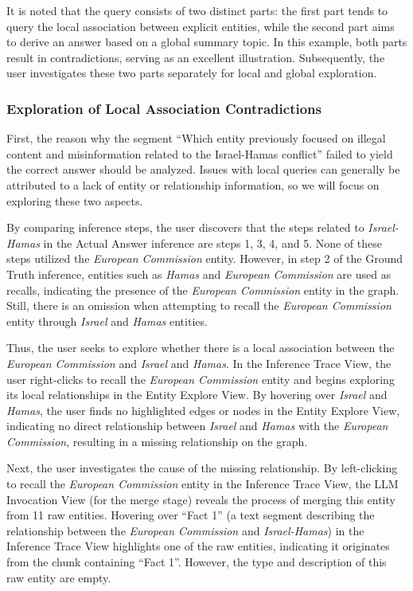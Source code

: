 It is noted that the query consists of two distinct parts: the first part tends to query the local association between explicit entities, while the second part aims to derive an answer based on a global summary topic. In this example, both parts result in contradictions, serving as an excellent illustration. Subsequently, the user investigates these two parts separately for local and global exploration.

\subsubsection{Exploration of Local Association Contradictions}

First, the reason why the segment ``Which entity previously focused on illegal content and misinformation related to the Israel-Hamas conflict'' failed to yield the correct answer should be analyzed. Issues with local queries can generally be attributed to a lack of entity or relationship information, so we will focus on exploring these two aspects.

By comparing inference steps, the user discovers that the steps related to \textit{Israel-Hamas} in the Actual Answer inference are steps 1, 3, 4, and 5. None of these steps utilized the \textit{European Commission} entity. However, in step 2 of the Ground Truth inference, entities such as \textit{Hamas} and \textit{European Commission} are used as recalls, indicating the presence of the \textit{European Commission} entity in the graph. Still, there is an omission when attempting to recall the \textit{European Commission} entity through \textit{Israel} and \textit{Hamas} entities.

Thus, the user seeks to explore whether there is a local association between the \textit{European Commission} and \textit{Israel} and \textit{Hamas}. In the Inference Trace View, the user right-clicks to recall the \textit{European Commission} entity and begins exploring its local relationships in the Entity Explore View. By hovering over \textit{Israel} and \textit{Hamas}, the user finds no highlighted edges or nodes in the Entity Explore View, indicating no direct relationship between \textit{Israel} and \textit{Hamas} with the \textit{European Commission}, resulting in a missing relationship on the graph.

Next, the user investigates the cause of the missing relationship. By left-clicking to recall the \textit{European Commission} entity in the Inference Trace View, the LLM Invocation View (for the merge stage) reveals the process of merging this entity from 11 raw entities. Hovering over ``Fact 1'' (a text segment describing the relationship between the \textit{European Commission} and \textit{Israel-Hamas}) in the Inference Trace View highlights one of the raw entities, indicating it originates from the chunk containing ``Fact 1''. However, the type and description of this raw entity are empty.

